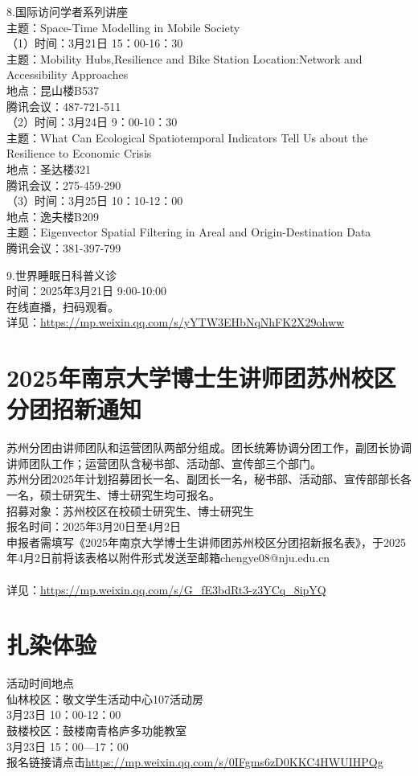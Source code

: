 \documentclass[letterpaper, 12pt]{article}
\begin{document}
\begin{multicols}{2}
8.国际访问学者系列讲座\\
主题：Space-Time Modelling in Mobile Society 
\\（1）时间：3月21日 15：00-16：30
\\主题：Mobility Hubs,Resilience and Bike Station Location:Network and Accessibility Approaches
\\地点：昆山楼B537
\\腾讯会议：487-721-511
\\（2）时间：3月24日 9：00-10：30
\\主题：What Can Ecological Spatiotemporal Indicators Tell Us about the Resilience to Economic Crisis
\\地点：圣达楼321
\\腾讯会议：275-459-290
\\（3）时间：3月25日 10：10-12：00
\\地点：逸夫楼B209
\\主题：Eigenvector Spatial Filtering in Areal and Origin-Destination Data
\\腾讯会议：381-397-799

9.世界睡眠日科普义诊\\
时间：2025年3月21日 9:00-10:00
\\在线直播，扫码观看。
\\详见：\url{https://mp.weixin.qq.com/s/yYTW3EHbNqNhFK2X29ohww}






\section{2025年南京大学博士生讲师团苏州校区分团招新通知}
苏州分团由讲师团队和运营团队两部分组成。团长统筹协调分团工作，副团长协调讲师团队工作；运营团队含秘书部、活动部、宣传部三个部门。
\\苏州分团2025年计划招募团长一名、副团长一名，秘书部、活动部、宣传部部长各一名，硕士研究生、博士研究生均可报名。
\\招募对象：苏州校区在校硕士研究生、博士研究生
\\报名时间：2025年3月20日至4月2日
\\申报者需填写《2025年南京大学博士生讲师团苏州校区分团招新报名表》，于2025年4月2日前将该表格以附件形式发送至邮箱chengye08@nju.edu.cn
\\
\\详见：\url{https://mp.weixin.qq.com/s/G_fE3bdRt3-z3YCq_8ipYQ}
\section{扎染体验}
活动时间地点\\
仙林校区：敬文学生活动中心107活动房\\
3月23日 10：00-12：00\\
鼓楼校区：鼓楼南青格庐多功能教室\\
3月23日 15：00—17：00\\
报名链接请点击\url{https://mp.weixin.qq.com/s/0IFgms6zD0KKC4HWUIHPQg}\\


\end{multicols}
\end{document}
